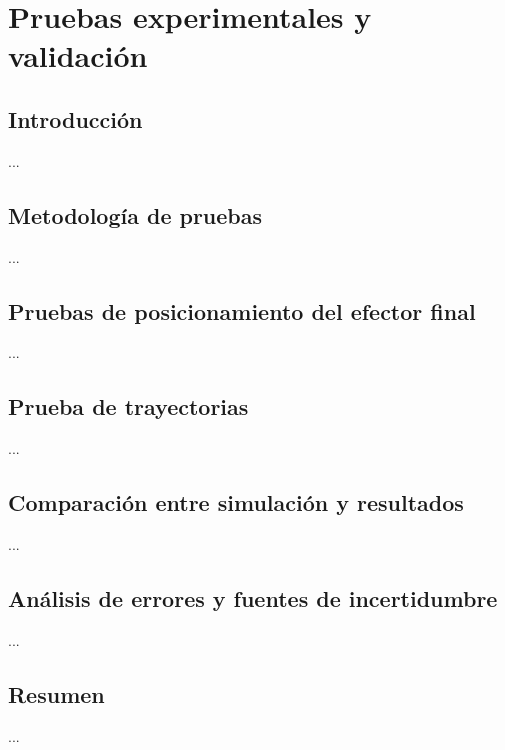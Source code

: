 \chapter{Pruebas experimentales y validación}
\label{cap:capitulo8}

\vspace{0.25cm}

\section{Introducción}
\label{sec:segundaseccion}

...

\section{Metodología de pruebas}
\label{sec:segundaseccion}

...

\section{Pruebas de posicionamiento del efector final}
\label{sec:segundaseccion}

...

\section{Prueba de trayectorias}
\label{sec:segundaseccion}

...

\section{Comparación entre simulación y resultados}
\label{sec:segundaseccion}

...

\section{Análisis de errores y fuentes de incertidumbre}
\label{sec:segundaseccion}

...

\section{Resumen}
\label{sec:segundaseccion}

...
